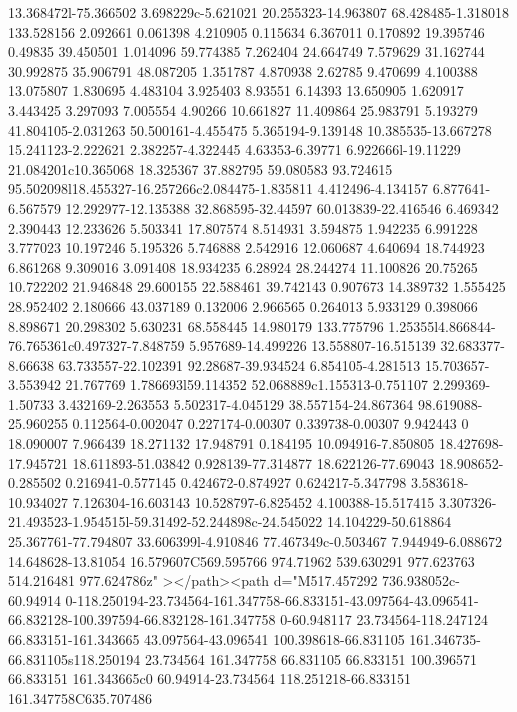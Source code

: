 {13.368472l-75.366502 3.698229c-5.621021 20.255323-14.963807 68.428485-1.318018 133.528156 2.092661 0.061398 4.210905 0.115634
6.367011 0.170892 19.395746 0.49835 39.450501 1.014096 59.774385 7.262404 24.664749 7.579629 31.162744 30.992875 35.906791
48.087205 1.351787 4.870938 2.62785 9.470699 4.100388 13.075807 1.830695 4.483104 3.925403 8.93551 6.14393 13.650905 1.620917
3.443425 3.297093 7.005554 4.90266 10.661827 11.409864 25.983791 5.193279 41.804105-2.031263 50.500161-4.455475 5.365194-9.139148
10.385535-13.667278 15.241123-2.222621 2.382257-4.322445 4.63353-6.39771 6.922666l-19.11229 21.084201c10.365068 18.325367
37.882795 59.080583 93.724615 95.502098l18.455327-16.257266c2.084475-1.835811 4.412496-4.134157 6.877641-6.567579
12.292977-12.135388 32.868595-32.44597 60.013839-22.416546 6.469342 2.390443 12.233626 5.503341 17.807574 8.514931 3.594875
1.942235 6.991228 3.777023 10.197246 5.195326 5.746888 2.542916 12.060687 4.640694 18.744923 6.861268 9.309016 3.091408 18.934235
6.28924 28.244274 11.100826 20.75265 10.722202 21.946848 29.600155 22.588461 39.742143 0.907673 14.389732 1.555425 28.952402
2.180666 43.037189 0.132006 2.966565 0.264013 5.933129 0.398066 8.898671 20.298302 5.630231 68.558445 14.980179 133.775796
1.25355l4.866844-76.765361c0.497327-7.848759 5.957689-14.499226 13.558807-16.515139 32.683377-8.66638 63.733557-22.102391
92.28687-39.934524 6.854105-4.281513 15.703657-3.553942 21.767769 1.786693l59.114352 52.068889c1.155313-0.751107 2.299369-1.50733
3.432169-2.263553 5.502317-4.045129 38.557154-24.867364 98.619088-25.960255 0.112564-0.002047 0.227174-0.00307 0.339738-0.00307
9.942443 0 18.090007 7.966439 18.271132 17.948791 0.184195 10.094916-7.850805 18.427698-17.945721 18.611893-51.03842
0.928139-77.314877 18.622126-77.69043 18.908652-0.285502 0.216941-0.577145 0.424672-0.874927 0.624217-5.347798 3.583618-10.934027
7.126304-16.603143 10.528797-6.825452 4.100388-15.517415 3.307326-21.493523-1.954515l-59.31492-52.244898c-24.545022
14.104229-50.618864 25.367761-77.794807 33.606399l-4.910846 77.467349c-0.503467 7.944949-6.088672 14.648628-13.81054
16.579607C569.595766 974.71962 539.630291 977.623763 514.216481 977.624786z"  ></path><path d="M517.457292 736.938052c-60.94914
0-118.250194-23.734564-161.347758-66.833151-43.097564-43.096541-66.832128-100.397594-66.832128-161.347758 0-60.948117
23.734564-118.247124 66.833151-161.343665 43.097564-43.096541 100.398618-66.831105 161.346735-66.831105s118.250194 23.734564
161.347758 66.831105 66.833151 100.396571 66.833151 161.343665c0 60.94914-23.734564 118.251218-66.833151 161.347758C635.707486
}
